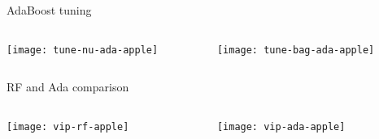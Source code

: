 \begin{frame}{AdaBoost tuning}

\begin{columns}[T]
\hspace*{-2.4em}\begin{column}{0.5\textwidth}
	\texttt{[image: tune-nu-ada-apple]}
\end{column}
\begin{column}{0.5\textwidth}
	\texttt{[image: tune-bag-ada-apple]}
\end{column}
\end{columns}

\end{frame}


\begin{frame}{RF and Ada comparison}



\begin{columns}[T]
\hspace*{-3.5em}\begin{column}{0.5\textwidth}
	\texttt{[image: vip-rf-apple]}
\end{column}
\begin{column}{0.5\textwidth}
	\texttt{[image: vip-ada-apple]}
\end{column}
\end{columns}

\end{frame}


